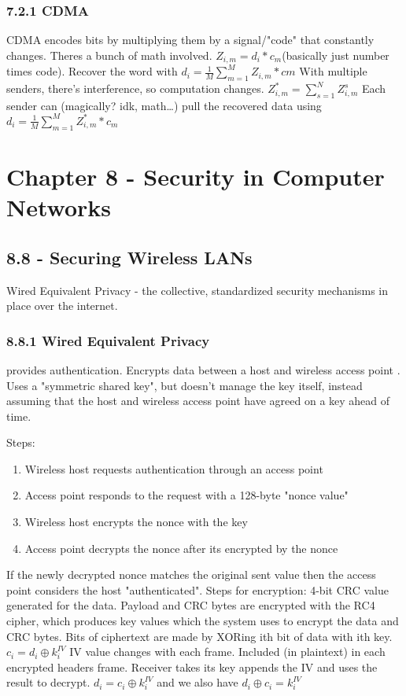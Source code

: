 \documentclass[11pt]{article}
\begin{document}
\subsubsection{7.2.1 CDMA}
\label{sec:org2c8b10e}
CDMA encodes bits by multiplying them  by a signal/"code" that constantly changes.
Theres a bunch of math involved.
\(Z_{i,m} = d_{i} * c_{m}\)(basically just number times code).
Recover the word with \(d_{i} = \frac{1}{M}\sum\limits_{m=1}^{M}{Z_{i,m}*c{m}}\)
With multiple senders, there's interference, so computation changes.
\(Z_{i,m}^{*} = \sum\limits_{s=1}^{N}{Z_{i,m}^{s}}\)
Each sender can (magically? idk, math\ldots{}) pull the recovered data using
\(d_{i} = \frac{1}{M}\sum\limits_{m=1}^{M}{Z_{i,m}^{*}*c_{m}}\)



\section{Chapter 8 - Security in Computer Networks}
\label{sec:orgbc742df}

\subsection{8.8 - Securing Wireless LANs}
\label{sec:org42496fa}
Wired Equivalent Privacy - the collective, standardized security mechanisms in place over the internet.

\subsubsection{8.8.1 Wired Equivalent Privacy}
\label{sec:org33381a4}
provides authentication. Encrypts data between a host and wireless access point . Uses a "symmetric shared key", but doesn't manage the key itself, instead assuming that the host and wireless access point have agreed on a key ahead of time.

Steps:
\begin{enumerate}
\item Wireless host requests authentication through an access point
\item Access point responds to the request with a 128-byte "nonce value"
\item Wireless host encrypts the nonce with the key
\item Access point decrypts the nonce after its encrypted by the nonce
\end{enumerate}


If the newly decrypted nonce matches the original sent value then the access point considers the host "authenticated".
Steps for encryption:
4-bit CRC value generated for the data. Payload and CRC bytes are encrypted with the RC4 cipher, which produces key values which the system uses to encrypt the data and CRC bytes. Bits of ciphertext are made by XORing ith bit of data with ith key.
\(c_{i} = d_{i} \oplus k_{i}^{IV}\)
IV value changes with each frame. Included (in plaintext) in each encrypted headers frame. Receiver takes its key appends the IV and uses the result to decrypt.
\(d_{i} = c_{i} \oplus k_{i}^{IV}\) and we also have \(d_{i} \oplus c_{i} = k_{i}^{IV}\)
\end{document}
